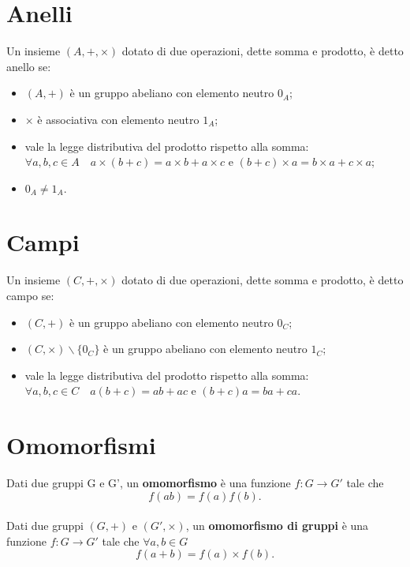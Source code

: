 \documentclass[a4paper]{article}
\begin{document}
        \section*{Anelli}
        Un insieme $(A, +, \times)$ dotato di due operazioni, dette somma e prodotto, \`{e} detto anello se:
        \begin{itemize}
                \item $(A,+)$ \`{e} un gruppo abeliano con elemento neutro $0_A$;
                \item $\times$ \`{e} associativa con elemento neutro $1_A$;
                \item vale la legge distributiva del prodotto rispetto alla somma: $\forall a,b,c \in A \quad a \times (b + c) = a \times b + a \times c \mbox{ e } (b + c) \times a = b \times a + c \times a$;
                \item $0_A \not= 1_A$.
        \end{itemize}


        \section*{Campi}
        Un insieme $(C, +, \times)$ dotato di due operazioni, dette somma e prodotto, \`{e} detto campo se:
        \begin{itemize}
                \item $(C,+)$ \`{e} un gruppo abeliano con elemento neutro $0_C$;
                \item $(C,\times) \backslash \{0_C\}$ \`{e} un gruppo abeliano con elemento neutro $1_C$;
                \item vale la legge distributiva del prodotto rispetto alla somma: $\forall a,b,c \in C \quad a(b+c) = ab+ac \mbox{ e } (b+c)a = ba+ca$.
        \end{itemize}


        \section*{Omomorfismi}
        Dati due gruppi G e G', \newline
        un \textbf{omomorfismo} \`{e} una funzione $f\!: G \to G'$ tale che
        \[
                f(ab) = f(a)f(b).
        \]

        \paragraph{}
        Dati due gruppi $(G, +)$ e $(G', \times)$, \newline
        un \textbf{omomorfismo di gruppi} \`{e} una funzione $f\!: G \to G'$ tale che $\forall a,b \in G$
        \[
                f(a + b) = f(a) \times f(b).
        \]
\end{document}

